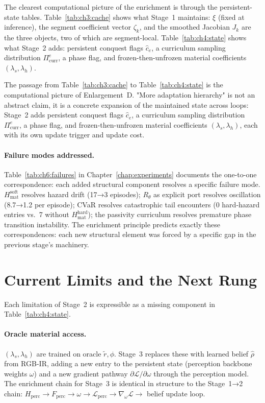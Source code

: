 The clearest computational picture of the enrichment is through
the persistent-state tables.
Table~\ref{tab:ch3:cache} shows what Stage~1 maintains:
$\xi$ (fixed at inference), the segment coefficient vector $\zeta_k$,
and the smoothed Jacobian $J_k$ are the three objects, two of which are
segment-local.
Table~\ref{tab:ch4:state} shows what Stage~2 adds:
persistent conquest flags $\hat{c}_e$, a curriculum sampling
distribution $\Pi_{\mathrm{curr}}^e$, a phase flag,
and frozen-then-unfrozen material coefficients $(\lambda_s,\lambda_h)$.

The passage from Table~\ref{tab:ch3:cache} to Table~\ref{tab:ch4:state}
is the computational picture of Enlargement~D.
"More adaptation hierarchy" is not an abstract claim, it is a
concrete expansion of the maintained state across loops:
Stage~2 adds persistent conquest flags $\hat{c}_e$, a curriculum
sampling distribution $\Pi_{\mathrm{curr}}^e$, a phase flag,
and frozen-then-unfrozen material coefficients $(\lambda_s,\lambda_h)$,
each with its own update trigger and update cost.

\paragraph{Failure modes addressed.}
Table~\ref{tab:ch6:failures} in Chapter~\ref{chap:experiments}
documents the one-to-one correspondence: each added structural
component resolves a specific failure mode.
$H_{\mathrm{mat}}^{\mathrm{soft}}$ resolves hazard drift
(17→3 episodes); $R_\theta$ as explicit port resolves oscillation
(8.7→1.2 per episode); CVaR resolves catastrophic tail encounters
(0 hard-hazard entries vs.\ 7 without $H_{\mathrm{mat}}^{\mathrm{hard}}$);
the passivity curriculum resolves premature phase transition instability.
The enrichment principle predicts exactly these correspondences:
each new structural element was forced by a specific gap in the
previous stage's machinery.

\section{Current Limits and the Next Rung}
\label{sec:ch5:limits}

Each limitation of Stage~2 is expressible as a missing component
in Table~\ref{tab:ch4:state}.

\paragraph{Oracle material access.}
$(\lambda_s,\lambda_h)$ are trained on oracle $\tilde{r},\phi$.
Stage~3 replaces these with learned belief $\hat\rho$ from RGB-IR,
adding a new entry to the persistent state (perception backbone
weights $\omega$) and a new gradient pathway
$\partial\mathcal{L}/\partial\omega$ through the perception model.
The enrichment chain for Stage~3 is identical in structure to the
Stage~1→2 chain:
$H_{\mathrm{perc}} \to F_{\mathrm{perc}} \to \omega \to
\mathcal{L}_{\mathrm{perc}} \to \nabla_\omega\mathcal{L} \to$
belief update loop.


